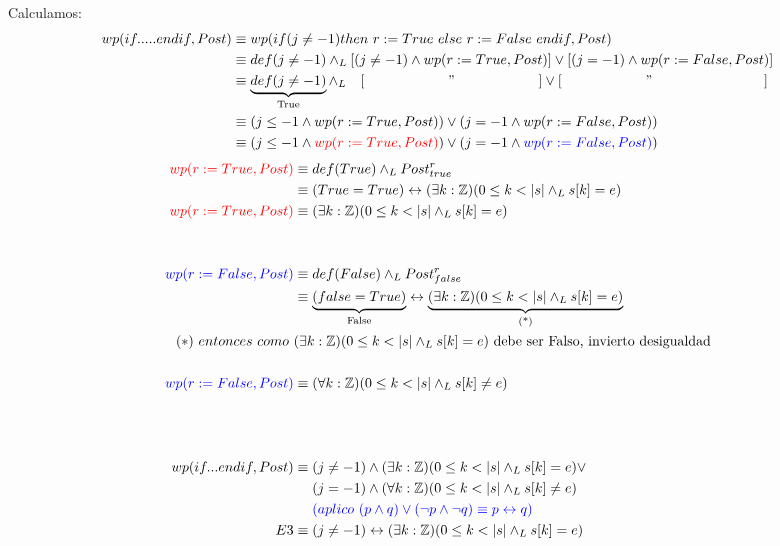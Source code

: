 \documentclass[12pt]{book}
\begin{document}
Calculamos:
\begin{align*}
 wp(if ..... endif , Post) &\equiv wp(if ( j \neq -1) then \ r := True \ else \ r := False \ endif , Post)  \\
&\equiv def(j\neq -1) \wedge_L  \left[ (j \neq -1) \wedge wp(r := True , Post) \right] \vee \left[ (j = -1) \wedge wp(r := False, Post)\right]  \\
&\equiv \underbrace{def(j\neq -1)}_{\text{True}} \wedge_L \quad [ \qquad \qquad \qquad " \qquad \qquad \qquad ] \vee [\qquad \qquad \qquad " \qquad \qquad \qquad \qquad ]  \\
&\equiv (j \leq -1 \wedge wp(r := True, Post)) \vee (j = -1 \wedge wp(r := False, Post)) \\
&\equiv (j \leq -1 \wedge \textcolor{red}{wp(r := True, Post)}) \vee (j = -1 \wedge \textcolor{blue}{ wp(r := False, Post)}) 
\end{align*}
\begin{align*}
\textcolor{red}{wp(r := True, Post)} &\equiv def (True) \wedge_L Post_{true}^r \\
&\equiv (True = True) \leftrightarrow (\exists k : \mathbb{Z})(0 \leq k < |s| \wedge_L s[k] = e) \\
\textcolor{red}{wp(r := True, Post)} &\equiv (\exists k : \mathbb{Z})(0 \leq k < |s| \wedge_L s[k] = e) \\ \\  \\
\textcolor{blue}{ wp(r := False, Post)} &\equiv def (False) \wedge_L Post_{false}^r \\
&\equiv \underbrace{(false = True)}_{\text{False}} \leftrightarrow \underbrace{(\exists k : \mathbb{Z})(0 \leq k < |s| \wedge_L s[k] = e)}_{\text{(*)}} \\
(*) \ entonces \ como \ & (\exists k : \mathbb{Z})(0 \leq k < |s| \wedge_L s[k] = e)  \text{ debe ser Falso,  invierto desigualdad} \\ \\
\textcolor{blue}{ wp(r := False, Post)} &\equiv (\forall k : \mathbb{Z})(0 \leq k < |s| \wedge_L s[k] \neq e)\\ \\ \\ \\
wp(if... endif , Post) &\equiv (j \neq -1) \wedge ( \exists k : \mathbb{Z})(0 \leq k < |s| \wedge_L
s[k] = e) \vee \\ 
& \quad \ (j = -1) \wedge (\forall k :\mathbb{Z})(0 \leq k < |s| \wedge_L s[k] \neq e) \\
& \quad \ \textcolor{blue}{(aplico \ (p \wedge q) \vee (\neg p \wedge \neg q) \equiv p \leftrightarrow q)} \\
E3 &\equiv (j \neq -1) \leftrightarrow (\exists k :\mathbb{Z})(0 \leq k < |s| \wedge_L s[k] = e) 
\end{align*}
\end{document}
